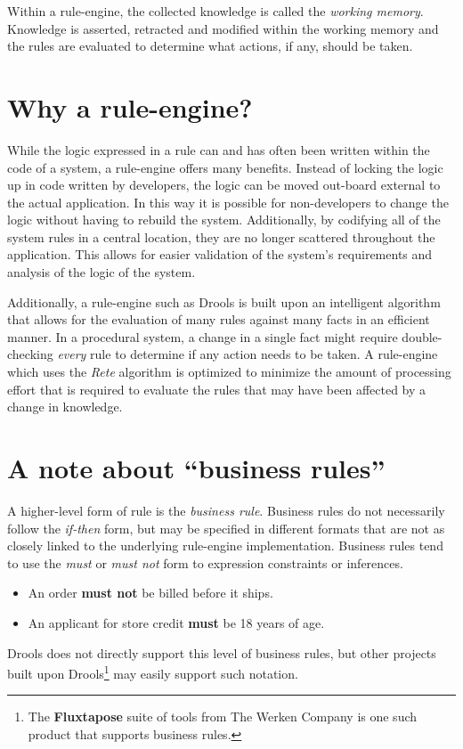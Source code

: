 Within a rule-engine, the collected knowledge is called the
\emph{working memory}.  Knowledge is
asserted, retracted and modified within the working memory and the
rules are evaluated to determine what actions, if any, should be
taken.

\section{Why a rule-engine?}

While the logic expressed in a rule can and has often been written
within the code of a system, a rule-engine offers many benefits.  Instead
of locking the logic up in code written by developers, the logic can
be moved out-board external to the actual application.  In this way
it is possible for non-developers to change the logic without having
to rebuild the system.  Additionally, by codifying all of the system
rules in a central location, they are no longer scattered throughout
the application.  This allows for easier validation of the system's
requirements and analysis of the logic of the system.

Additionally, a rule-engine such as Drools is built upon an
intelligent algorithm that allows for the evaluation of many
rules against many facts in an efficient manner.  In a procedural
system, a change in a single fact might require double-checking
\emph{every} rule to determine if any action needs to be taken.
A rule-engine which uses the \emph{Rete} algorithm
is optimized to minimize the amount of processing effort that is
required to evaluate the rules that may have been affected by
a change in knowledge.

\section{A note about ``business rules''}

A higher-level form of rule is the \emph{business rule}.  Business rules do not necessarily follow the \emph{if-then}
form, but may be specified in different formats that are not as
closely linked to the underlying rule-engine implementation.  Business
rules tend to use the \emph{must} or \emph{must not} form to
expression constraints or inferences.

\begin{itemize}
  \item An order \textbf{must not} be billed before it ships.
  \item An applicant for store credit \textbf{must} be 18 years of age.
\end{itemize}

Drools does not directly support this level of business rules, but
other projects built upon Drools\footnote{The
\textbf{Fluxtapose}
suite of tools from The Werken Company is one such product that
supports business rules.} may easily support such
notation.

